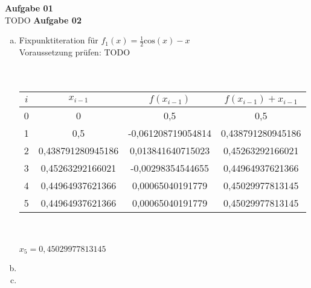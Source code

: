 \documentclass[a4paper,10pt]{article}
\begin{document}
	\parindent0pt
	\textbf{Aufgabe 01}\\
	TODO
	\newpage
	\textbf{Aufgabe 02}
	\begin{enumerate}[a)]
		\item Fixpunktiteration für $f_1(x) = \frac{1}{2} \mathrm{cos}(x) - x$\\
		Voraussetzung prüfen: TODO\\\\\\
		\begin{tabular}{|c|c|c|c|}
			\hline 
			$i$& $x_{i-1}$ & $f(x_{i-1})$ & $f(x_{i-1}) + x_{i-1}$ \\ 
			\hline 
			0 & 0 & 0,5 & 0,5 \\ 
			\hline 
			1 & 0,5 & -0,061208719054814 & 0,438791280945186 \\
			\hline 
			2 &  0,438791280945186 & 0,013841640715023 & 0,45263292166021  \\
			\hline 
			3 & 0,45263292166021 & -0,00298354544655 & 0,44964937621366  \\
			\hline 
			4 & 0,44964937621366 & 0,00065040191779	& 0,45029977813145 \\
			\hline 
			5 & 0,44964937621366 & 0,00065040191779 & 0,45029977813145 \\
			\hline 
		\end{tabular} \\\\
		$x_5 = 0,45029977813145$
	
	
	
	
	
	
	
		\item 
		\item 
	\end{enumerate}
	
\end{document}
